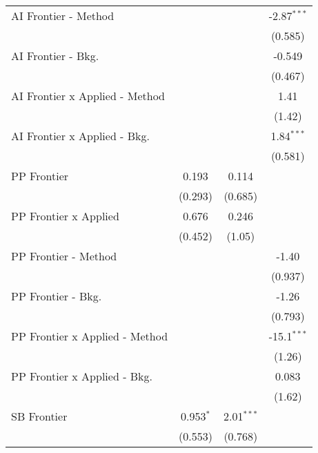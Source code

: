 \begin{tabular}{lccc}
   AI Frontier - Method           &               &              & -2.87$^{***}$\\   
                                  &               &              & (0.585)\\   
   AI Frontier - Bkg.             &               &              & -0.549\\   
                                  &               &              & (0.467)\\   
   AI Frontier x Applied - Method &               &              & 1.41\\   
                                  &               &              & (1.42)\\   
   AI Frontier x Applied - Bkg.   &               &              & 1.84$^{***}$\\   
                                  &               &              & (0.581)\\   
   PP Frontier                    & 0.193         & 0.114        &   \\   
                                  & (0.293)       & (0.685)      &   \\   
   PP Frontier x Applied          & 0.676         & 0.246        &   \\   
                                  & (0.452)       & (1.05)       &   \\   
   PP Frontier - Method           &               &              & -1.40\\   
                                  &               &              & (0.937)\\   
   PP Frontier - Bkg.             &               &              & -1.26\\   
                                  &               &              & (0.793)\\   
   PP Frontier x Applied - Method &               &              & -15.1$^{***}$\\   
                                  &               &              & (1.26)\\   
   PP Frontier x Applied - Bkg.   &               &              & 0.083\\   
                                  &               &              & (1.62)\\   
   SB Frontier                    & 0.953$^{*}$   & 2.01$^{***}$ &   \\   
                                  & (0.553)       & (0.768)      &   \\   

\end{tabular}
